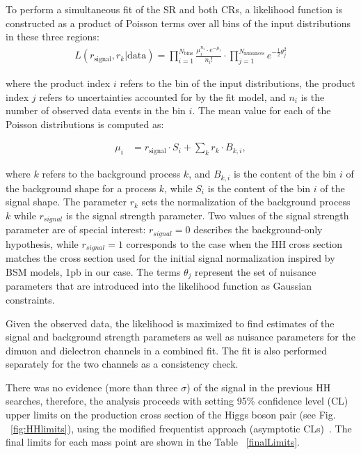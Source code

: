 

To perform a simultaneous fit of the SR and both CRs, a likelihood function is constructed as a product
of Poisson terms over all bins of the input distributions in these three regions:
\begin{align*}
 L(r_{\text{signal}}, r_{k}|\text{data}) = \prod_{i=1}^{N_{\mathrm{bins}}}\frac{\mu_{i}^{n_{i}}\cdot e^{-\mu_{i}}}{n_{i}!}
\cdot \prod_{j=1}^{N_{\mathrm{nuisances}}} e^{-\frac{1}{2}\theta_{j}^{2}}
\end{align*}

where the product index $i$ refers to the bin of the input distributions, the product index $j$
refers to uncertainties accounted for by the fit model, and $n_i$ is the number of observed data
events in the bin $i$. The mean value for each of the Poisson distributions is computed as:

\begin{align*}
\mu_{i} &= r_{\text{signal}} \cdot S_{i} + \sum_{k}r_{k}\cdot B_{k,i},
\end{align*}


where $k$ refers to the background process $k$, and $B_{k,i}$ is the content of the bin $i$ of the background
shape for a process $k$, while $S_i$ is the content of the bin $i$ of the signal shape. The parameter $r_k$
sets the normalization of the background process $k$ while $r_{signal}$ is the signal strength parameter.
Two values of the signal strength parameter are of special interest:  $r_{signal} = 0$ describes the
background-only hypothesis, while $r_{signal} = 1$ corresponds to the case when the HH cross section
matches the cross section used for the initial signal normalization inspired by BSM models, 1pb in our case. 
The terms $\theta_j$ represent the set of nuisance parameters that are introduced into the likelihood
function as Gaussian constraints. 


Given the observed data, the likelihood is maximized to find estimates of the signal and background strength
parameters as well as nuisance parameters for the dimuon and dielectron channels in a combined fit.
The fit is also performed separately for the two channels as a consistency check.


There was no evidence (more
than three $\sigma$) of the signal in the previous HH searches, therefore,
the analysis proceeds with setting 95\% confidence level (CL) upper
limits on the production cross section of the Higgs boson pair (see Fig. ~\ref{fig:HHlimits}), using the modified frequentist approach (asymptotic CLs)~\cite{Junk:1999kv,LEP-CLs, HIG-11-011, Cowan:2010js}. The final limits for each mass point are shown in the Table ~\ref{finalLimits}.


